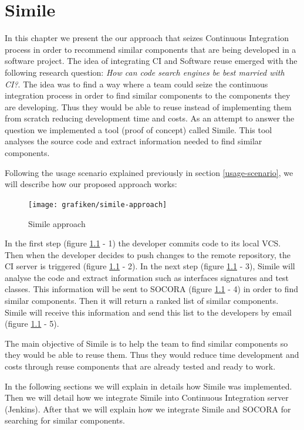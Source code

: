 \chapter{Simile}
\label{chap:simile}
In this chapter we present the our approach that seizes Continuous Integration process in order to recommend similar components that are being developed in a software project. The idea of integrating CI and Software reuse emerged with the following research question: \emph{How can code search engines be best married with CI?}. The idea was to find a way where a team could seize the continuous integration process in order to find similar components to the components they are developing. Thus they would be able to reuse instead of implementing them from scratch reducing development time and costs. As an attempt to answer the question we implemented a tool (proof of concept) called Simile. This tool analyses the source code and extract information needed to find similar components.

Following the usage scenario explained previously in section \ref{usage-scenario}, we will describe how our proposed approach works:

\begin{figure}[H]
	\centering
    \texttt{[image: grafiken/simile-approach]}
    \caption{Simile approach}
    \label{fig:simile-01}
\end{figure}

In the first step (figure \ref{fig:simile-01} - 1) the developer commits code to its local VCS. Then when the developer decides to push changes to the remote repository, the CI server is triggered (figure \ref{fig:simile-01} - 2). In the next step (figure \ref{fig:simile-01} - 3), Simile will analyse the code and extract information such as interfaces signatures and test classes. This information will be sent to SOCORA (figure \ref{fig:simile-01} - 4) in order to find similar components. Then it will return a ranked list of similar components. Simile will receive this information and send this list to the developers by email (figure \ref{fig:simile-01} - 5).

The main objective of Simile is to help the team to find similar components so they would be able to reuse them. Thus they would reduce time development and costs through reuse components that are already tested and ready to work.

In the following sections we will explain in details how Simile was implemented. Then we will detail how we integrate Simile into Continuous Integration server (Jenkins). After that we will explain how we integrate Simile and SOCORA for searching for similar components.


